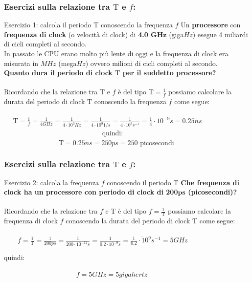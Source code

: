 \begin{frame}
	\frametitle{Esercizi sulla relazione tra $\mathrm{T}$ e $f$:}
	
	\begin{block}{Esercizio 1: calcola il periodo $\mathrm{T}$ conoscendo la frequenza $f$}
		Un \textbf{processore} con \textbf{frequenza di clock} (o velocità di clock) di \textbf{4.0 $\pmb{GHz}$} (giga$Hz$) esegue 4 miliardi di cicli completi al secondo.\\
		In passato le CPU erano molto più lente di oggi e la frequenza di clock era misurata in $MHz$ (mega$Hz$) ovvero milioni di cicli completi al secondo.\\
		\textbf{Quanto dura il periodo di clock $\pmb{\mathrm{T}}$ per il suddetto processore?}\\~\\
		\pause
		Ricordando che la relazione tra $\mathrm{T}$ e $f$ è del tipo $\mathrm{T} = \frac{1}{f}$ possiamo calcolare la durata del periodo di clock $\mathrm{T}$ conoscendo la frequenza $f$ come segue:\\~\\
		\pause
		$\quad\,\, \mathrm{T} = \frac{1}{f} = \frac{1}{4 GHz} = \frac{1}{4 \cdot 10^9 Hz} = \frac{1}{4 \cdot 10^9 1/s} = \frac{1}{4 \cdot 10^9 s^{-1}} = \frac{1}{4} \cdot 10^{-9} s = 0.25ns$\\ \vspace{0.4em}
		\pause
		$\qquad\qquad\qquad\qquad\qquad\qquad\qquad$	quindi:\\ \vspace{0.4em}
		$\qquad\qquad\qquad\qquad \mathrm{T} = 0.25ns = 250 ps = 250$ picosecondi
	\end{block}
	
\end{frame}


\begin{frame}
	\frametitle{Esercizi sulla relazione tra $\mathrm{T}$ e $f$:}
	
	\begin{block}{Esercizio 2: calcola la frequenza $f$ conoscendo il periodo $\mathrm{T}$}
		\textbf{Che frequenza di clock ha un processore con periodo di clock di 200$\pmb{ps}$ (picosecondi)?}\\~\\
		\pause
		Ricordando che la relazione tra $f$ e $\mathrm{T}$ è del tipo $f = \frac{1}{\mathrm{T}}$ possiamo calcolare la frequenza di clock $f$ conoscendo la durata del periodo di clock $\mathrm{T}$ come segue:\\~\\
		\pause
		$\qquad f = \frac{1}{\mathrm{T}} = \frac{1}{200 ps} = \frac{1}{200 \cdot 10^{-12} s} = \frac{1}{0.2 \cdot 10^{-9} s} = \frac{1}{0.2} \cdot \dot 10^9 s^{-1} = 5 GHz$
		\pause
		\begin{center}
			quindi:
		\end{center}
		$\qquad\qquad\qquad\qquad\qquad\;\; f = 5 GHz = 5 gigahertz$
	\end{block}
	
\end{frame}

